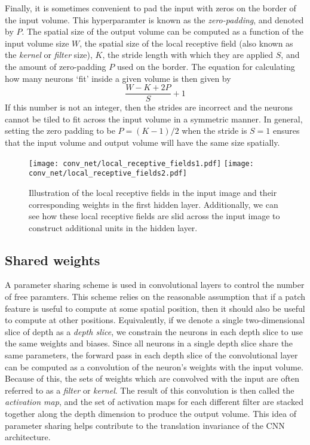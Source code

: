 \documentclass[../main.tex]{subfiles}
\begin{document}
%
Finally, it is sometimes convenient to pad the input with zeros on the border of the input volume.
%
This hyperparamter is known as the \emph{zero-padding}, and denoted by $P$.
%
The spatial size of the output volume can be computed as a function of the input volume size $W$, the spatial size of
the local receptive field (also known as the \emph{kernel} or \emph{filter} size), $K$, the stride length with which
they are applied $S$, and the amount of zero-padding $P$ used on the border.
%
The equation for calculating how many neurons `fit' inside a given volume is then given by
%
\begin{equation}
  \frac{W - K + 2P}{S} + 1
\end{equation}
%
If this number is not an integer, then the strides are incorrect and the neurons cannot be tiled to fit across the
input volume in a symmetric manner.
%
In general, setting the zero padding to be $P = (K - 1) / 2$ when the stride is $S=1$ ensures that the input volume and
output volume will have the same size spatially.
%
\begin{figure}[htpb]
  \centering
  \texttt{[image: conv\_net/local\_receptive\_fields1.pdf]}
  \hfill
  \texttt{[image: conv\_net/local\_receptive\_fields2.pdf]}
  \caption{Illustration of the local receptive fields in the input image and their corresponding weights in the first
    hidden layer. Additionally, we can see how these local receptive fields are slid across the input image to
  construct additional units in the hidden layer.}%
  \label{fig:local_receptive_field}
\end{figure}
%
\subsection{Shared weights}
A parameter sharing scheme is used in convolutional layers to control the number of free paramters.
%
This scheme relies on the reasonable assumption that if a patch feature is useful to compute at some spatial position,
then it should also be useful to compute at other positions.
%
Equivalently, if we denote a single two-dimensional slice of depth as a \emph{depth slice}, we constrain the neurons in
each depth slice to use the same weights and biases.
%
Since all neurons in a single depth slice share the same parameters, the forward pass in each depth slice of the
convolutional layer can be computed as a convolution of the neuron's weights with the input volume.
%
Because of this, the sets of weights which are convolved with the input are often referred to as a \emph{filter} or
\emph{kernel}.
%
The result of this convolution is then called the \emph{activation map}, and the set of activation maps for each
different filter are stacked together along the depth dimension to produce the output volume.
%
This idea of parameter sharing helps contribute to the translation invariance of the CNN architecture.
%
\end{document}
